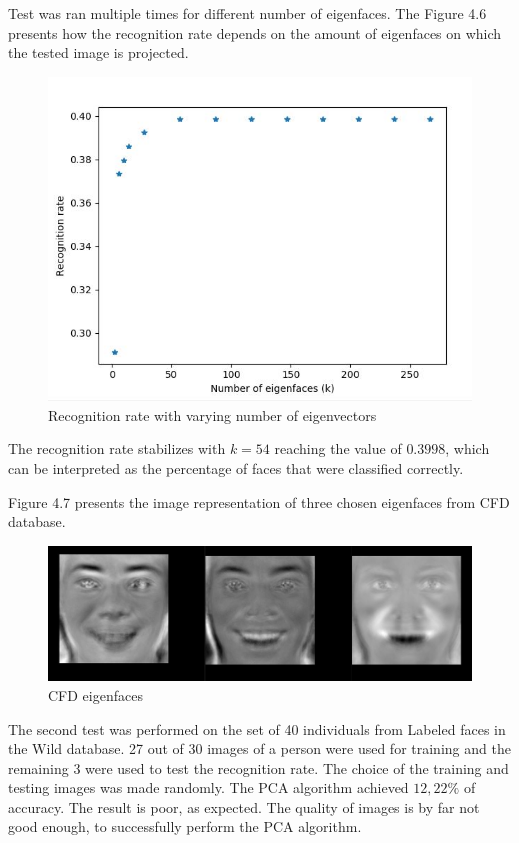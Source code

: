Test was ran multiple times for different number of eigenfaces. The Figure 4.6 presents how the recognition rate depends on the amount of eigenfaces on which the tested image is projected. 

\begin{figure}[H]
\centering
\includegraphics[scale=0.7]{rec_rate_vs_number_of_eigenfaces.jpg}
\caption{Recognition rate with varying number of eigenvectors}
\end{figure} 

The recognition rate stabilizes with $k = 54$ reaching the value of $0.3998$, which can be interpreted as the percentage of faces that were classified correctly. 

Figure 4.7 presents the image representation of three chosen eigenfaces from CFD database.

\begin{figure}[H]
\centering
\includegraphics[scale=0.3]{eigenfaces_CFD.jpg}
\caption{CFD eigenfaces}
\end{figure} 


The second test was performed on the set of 40 individuals from Labeled faces in the Wild database. 27 out of 30 images of a person were used for training and the remaining 3 were used to test the recognition rate. The choice of the training and testing images was made randomly.
The PCA algorithm achieved $12,22\%$ of accuracy. The result is poor, as expected. The quality of images is by far not good enough, to successfully perform the PCA algorithm.



